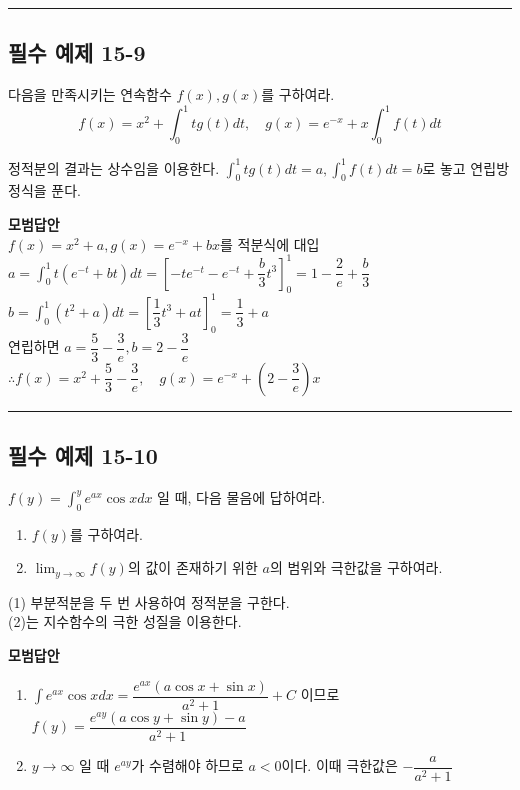 \documentclass[a4paper,11pt]{article}
\begin{document}
\vspace{0.5cm}
\hrule
\vspace{0.5cm}

\subsection*{필수 예제 15-9}
다음을 만족시키는 연속함수 $f(x), g(x)$를 구하여라.
\[ f(x) = x^2 + \int_{0}^{1} tg(t) dt, \quad g(x) = e^{-x} + x \int_{0}^{1} f(t) dt \]

\begin{studybox}
정적분의 결과는 상수임을 이용한다. $\int_{0}^{1} tg(t) dt = a, \int_{0}^{1} f(t) dt = b$로 놓고 연립방정식을 푼다.
\end{studybox}

\textbf{모범답안}\\
$f(x) = x^2+a, g(x) = e^{-x}+bx$를 적분식에 대입\\
$a = \int_0^1 t(e^{-t}+bt) dt = [-te^{-t}-e^{-t}+\dfrac{b}{3}t^3]_0^1 = 1-\dfrac{2}{e}+\dfrac{b}{3}$\\
$b = \int_0^1 (t^2+a) dt = [\dfrac{1}{3}t^3+at]_0^1 = \dfrac{1}{3}+a$\\
연립하면 $a = \dfrac{5}{3}-\dfrac{3}{e}, b = 2-\dfrac{3}{e}$\\
$\therefore f(x) = x^2 + \dfrac{5}{3}-\dfrac{3}{e}, \quad g(x) = e^{-x} + (2-\dfrac{3}{e})x$

\vspace{0.5cm}
\hrule
\vspace{0.5cm}

\subsection*{필수 예제 15-10}
$f(y) = \displaystyle\int_{0}^{y} e^{ax}\cos x dx$ 일 때, 다음 물음에 답하여라.
\begin{enumerate}[label=(\arabic*)]
    \item $f(y)$를 구하여라.
    \item $\displaystyle\lim_{y \to \infty} f(y)$의 값이 존재하기 위한 $a$의 범위와 극한값을 구하여라.
\end{enumerate}

\begin{studybox}
(1) 부분적분을 두 번 사용하여 정적분을 구한다. \\
(2)는 지수함수의 극한 성질을 이용한다.
\end{studybox}

\textbf{모범답안}
\begin{enumerate}[label=(\arabic*)]
    \item $\int e^{ax}\cos x dx = \dfrac{e^{ax}(a\cos x + \sin x)}{a^2+1} + C$ 이므로\\
    $f(y) = \dfrac{e^{ay}(a\cos y + \sin y) - a}{a^2+1}$
    \item $y \to \infty$ 일 때 $e^{ay}$가 수렴해야 하므로 $a < 0$이다. 이때 극한값은 $-\dfrac{a}{a^2+1}$
\end{enumerate}
\end{document}
